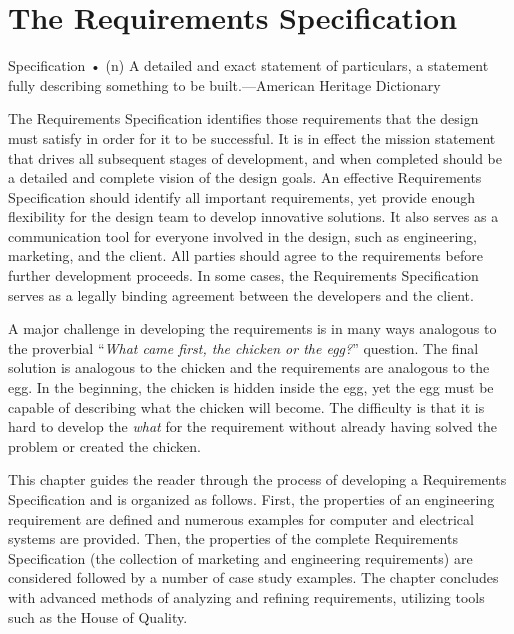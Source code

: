 \chapter{The Requirements Specification}
\label{chapter:requirementSpec}
\graphicspath{ {./chapter03/Fig} }

\begin{itquote}
Specification • (n) A detailed and exact statement of particulars, a
statement fully describing something to be built.---American Heritage
Dictionary
\end{itquote}

The Requirements Specification identifies those requirements that the
design must satisfy in order for it to be successful. It is in effect
the mission statement that drives all subsequent stages of development,
and when completed should be a detailed and complete vision of the
design goals. An effective Requirements Specification should identify
all important requirements, yet provide enough flexibility for the
design team to develop innovative solutions. It also serves as a
communication tool for everyone involved in the design, such as
engineering, marketing, and the client. All parties should agree to the
requirements before further development proceeds. In some cases, the
Requirements Specification serves as a legally binding agreement between
the developers and the client.

A major challenge in developing the requirements is in many ways
analogous to the proverbial ``\emph{What came first, the chicken or the
egg?}'' question. The final solution is analogous to the chicken and the
requirements are analogous to the egg. In the beginning, the chicken is
hidden inside the egg, yet the egg must be capable of describing what
the chicken will become. The difficulty is that it is hard to develop
the \emph{what} for the requirement without already having solved the
problem or created the chicken.

This chapter guides the reader through the process of developing a
Requirements Specification and is organized as follows. First, the
properties of an engineering requirement are defined and numerous
examples for computer and electrical systems are provided. Then, the
properties of the complete Requirements Specification (the collection of
marketing and engineering requirements) are considered followed by a
number of case study examples. The chapter concludes with advanced
methods of analyzing and refining requirements, utilizing tools such as
the House of Quality.

